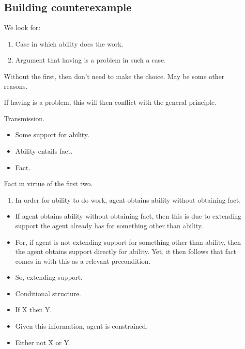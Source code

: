 \documentclass[10pt]{article}
\begin{document}
\subsection{Building counterexample}
\label{sec:build-count}

We look for:
\begin{enumerate}
\item Case in which ability does the work.
\item Argument that having is a problem in such a case.
\end{enumerate}

Without the first, then don't need to make the choice.
May be some other reasons.

If having is a problem, this will then conflict with the general principle.

Transmission.

\begin{itemize}
\item Some support for ability.
\item Ability entails fact.
\item Fact.
\end{itemize}

Fact in virtue of the first two.

\begin{enumerate}
\item In order for ability to do work, agent obtains ability without obtaining fact.
\end{enumerate}

\begin{itemize}
\item If agent obtains ability without obtaining fact, then this is due to extending support the agent already has for something other than ability.
\item For, if agent is not extending support for something other than ability, then the agent obtains support directly for ability.
  Yet, it then follows that fact comes in with this as a relevant precondition.
\end{itemize}

\begin{itemize}
\item So, extending support.
\end{itemize}

\begin{itemize}
\item Conditional structure.
\item If X then Y.
\item Given this information, agent is constrained.
\item Either not X or Y.
\end{itemize}
\end{document}

